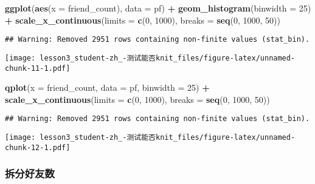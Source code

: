 \documentclass[]{article}
\newenvironment{Shaded}{\begin{snugshade}}{\end{snugshade}}
\newcommand{\DataTypeTok}[1]{\textcolor[rgb]{0.13,0.29,0.53}{#1}}
\newcommand{\DecValTok}[1]{\textcolor[rgb]{0.00,0.00,0.81}{#1}}
\newcommand{\KeywordTok}[1]{\textcolor[rgb]{0.13,0.29,0.53}{\textbf{#1}}}
\newcommand{\NormalTok}[1]{#1}
\newcommand{\OperatorTok}[1]{\textcolor[rgb]{0.81,0.36,0.00}{\textbf{#1}}}
\newcommand{\StringTok}[1]{\textcolor[rgb]{0.31,0.60,0.02}{#1}}
\begin{document}
\begin{Shaded}
\begin{Highlighting}[]
\KeywordTok{ggplot}\NormalTok{(}\KeywordTok{aes}\NormalTok{(}\DataTypeTok{x =}\NormalTok{ friend_count), }\DataTypeTok{data =}\NormalTok{ pf) }\OperatorTok{+}\StringTok{ }
\StringTok{  }\KeywordTok{geom_histogram}\NormalTok{(}\DataTypeTok{binwidth =} \DecValTok{25}\NormalTok{) }\OperatorTok{+}\StringTok{ }
\StringTok{  }\KeywordTok{scale_x_continuous}\NormalTok{(}\DataTypeTok{limits =} \KeywordTok{c}\NormalTok{(}\DecValTok{0}\NormalTok{, }\DecValTok{1000}\NormalTok{), }\DataTypeTok{breaks =} \KeywordTok{seq}\NormalTok{(}\DecValTok{0}\NormalTok{, }\DecValTok{1000}\NormalTok{, }\DecValTok{50}\NormalTok{))}
\end{Highlighting}
\end{Shaded}

\begin{verbatim}
## Warning: Removed 2951 rows containing non-finite values (stat_bin).
\end{verbatim}

\texttt{[image: lesson3\_student-zh\_-测试能否knit\_files/figure-latex/unnamed-chunk-11-1.pdf]}

\begin{Shaded}
\begin{Highlighting}[]
\KeywordTok{qplot}\NormalTok{(}\DataTypeTok{x =}\NormalTok{ friend_count, }\DataTypeTok{data =}\NormalTok{ pf, }\DataTypeTok{binwidth =} \DecValTok{25}\NormalTok{) }\OperatorTok{+}\StringTok{ }
\StringTok{  }\KeywordTok{scale_x_continuous}\NormalTok{(}\DataTypeTok{limits =} \KeywordTok{c}\NormalTok{(}\DecValTok{0}\NormalTok{, }\DecValTok{1000}\NormalTok{), }\DataTypeTok{breaks =} \KeywordTok{seq}\NormalTok{(}\DecValTok{0}\NormalTok{, }\DecValTok{1000}\NormalTok{, }\DecValTok{50}\NormalTok{))}
\end{Highlighting}
\end{Shaded}

\begin{verbatim}
## Warning: Removed 2951 rows containing non-finite values (stat_bin).
\end{verbatim}

\texttt{[image: lesson3\_student-zh\_-测试能否knit\_files/figure-latex/unnamed-chunk-12-1.pdf]}

\subsubsection{拆分好友数}
\end{document}
